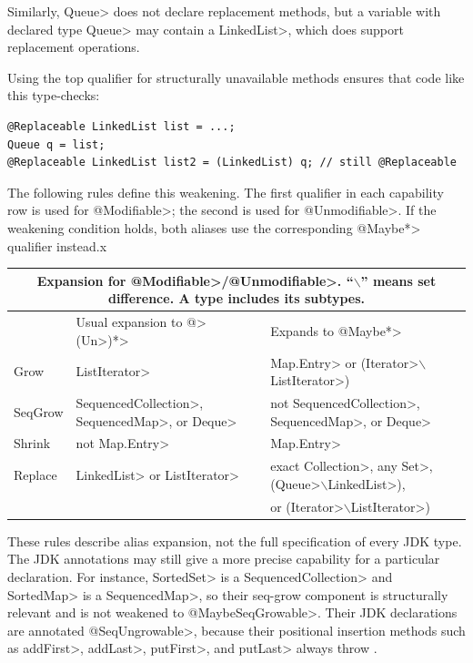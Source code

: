 Similarly, \<Queue> does not declare replacement methods, but a variable
with declared type
\<Queue> may contain a \<LinkedList>, which does support
replacement operations.

Using the top qualifier for structurally unavailable methods ensures that
code like this type-checks:

\begin{Verbatim}
@Replaceable LinkedList list = ...;
Queue q = list;
@Replaceable LinkedList list2 = (LinkedList) q; // still @Replaceable
\end{Verbatim}



The following rules define this weakening.  The first qualifier in each
capability row is used for \<@Modifiable>; the second is used for
\<@Unmodifiable>.  If the weakening condition holds, both aliases use the
corresponding \<@Maybe*> qualifier instead.x



\noindent
\begin{tabular}{l|l|l}
\multicolumn{3}{c}{Expansion for
\<@Modifiable>/\<@Unmodifiable>. ``$\backslash$'' means set difference.  A
type includes its subtypes.} \\ \hline
& Usual expansion to \<@>(\<Un>)\<*> & Expands to \<@Maybe*> \\ \hline
Grow
& \<ListIterator>
& \<Map.Entry> or (\<Iterator>$\backslash$\<ListIterator>) \\
SeqGrow
& \<SequencedCollection>, \<SequencedMap>, or \<Deque>
& not \<SequencedCollection>, \<SequencedMap>, or \<Deque> \\
Shrink
& not \<Map.Entry>
& \<Map.Entry> \\
Replace
& \<LinkedList> or \<ListIterator>
& exact \<Collection>, any \<Set>, (\<Queue>$\backslash$\<LinkedList>), \\
&&  or (\<Iterator>$\backslash$\<ListIterator>) \\
\end{tabular}

These rules describe alias expansion, not the full specification of every JDK
type.  The JDK annotations may still give a more precise capability for a
particular declaration.  For instance, \<SortedSet> is a
\<SequencedCollection> and \<SortedMap> is a \<SequencedMap>, so their
seq-grow component is structurally relevant and is not weakened to
\<@MaybeSeqGrowable>.  Their JDK declarations are annotated
\<@SeqUngrowable>, because their positional insertion methods such as
\<addFirst>, \<addLast>, \<putFirst>, and \<putLast> always throw
\UnsupportedOperationException.


